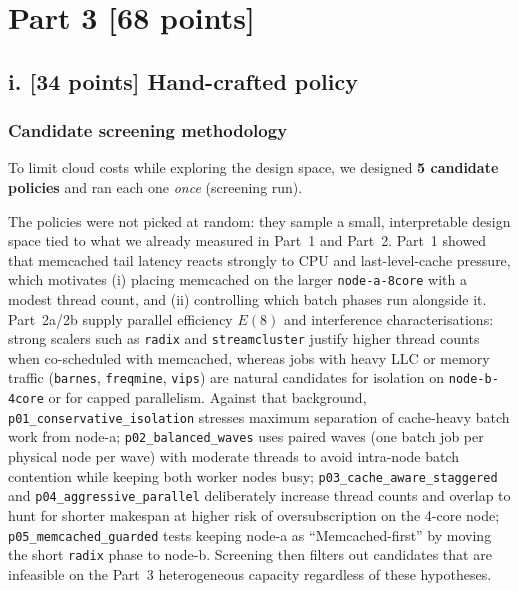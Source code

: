 
\section*{Part 3 [68 points]}

\subsection*{i. [34 points] Hand-crafted policy}

\subsubsection*{Candidate screening methodology}

To limit cloud costs while exploring the design space, we designed
\textbf{5 candidate policies} and ran each one \emph{once} (screening run).

The policies were not picked at random: they sample a small, interpretable
design space tied to what we already measured in Part~1 and Part~2.
Part~1 showed that memcached tail latency reacts strongly to CPU and
last-level-cache pressure, which motivates (i) placing memcached on the
larger \texttt{node-a-8core} with a modest thread count, and (ii) controlling
which batch phases run alongside it.
Part~2a/2b supply parallel efficiency $E(8)$ and interference characterisations:
strong scalers such as \texttt{radix} and \texttt{streamcluster} justify
higher thread counts when co-scheduled with memcached, whereas jobs with
heavy LLC or memory traffic (\texttt{barnes}, \texttt{freqmine},
\texttt{vips}) are natural candidates for isolation on \texttt{node-b-4core}
or for capped parallelism.
Against that background, \texttt{p01\_conservative\_isolation} stresses
maximum separation of cache-heavy batch work from node-a;
\texttt{p02\_balanced\_waves} uses paired waves (one batch job per physical
node per wave) with moderate threads to avoid intra-node batch contention while
keeping both worker nodes busy;
\texttt{p03\_cache\_aware\_staggered} and \texttt{p04\_aggressive\_parallel}
deliberately increase thread counts and overlap to hunt for shorter makespan at
higher risk of oversubscription on the 4-core node;
\texttt{p05\_memcached\_guarded} tests keeping node-a as ``Memcached-first''
by moving the short \texttt{radix} phase to node-b.
Screening then filters out candidates that are infeasible on the Part~3
heterogeneous capacity regardless of these hypotheses.

